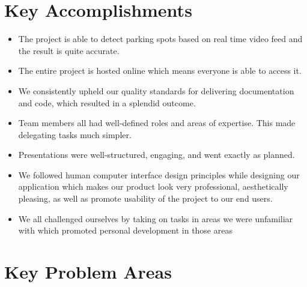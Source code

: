 \documentclass{article}
\begin{document}
\section{Key Accomplishments}

  \begin{itemize}
      \item The project is able to detect parking spots based on real time video
      feed and the result is quite accurate.
      \item The entire project is hosted online which means everyone is able to
      access it.
      \item We consistently upheld our quality standards for delivering
      documentation and code, which resulted in a splendid outcome.
      \item Team members all had well-defined roles and areas of expertise. This
      made delegating tasks much simpler.
      \item Presentations were well-structured, engaging, and went exactly as
      planned.
      \item We followed human computer interface design principles while
      designing our application which makes our product look very professional,
      aesthetically pleasing, as well as promote usability of the project to our
      end users.
      \item We all challenged ourselves by taking on tasks in areas we were
      unfamiliar with which promoted personal development in those areas 
  \end{itemize}

\section{Key Problem Areas}
\end{document}
